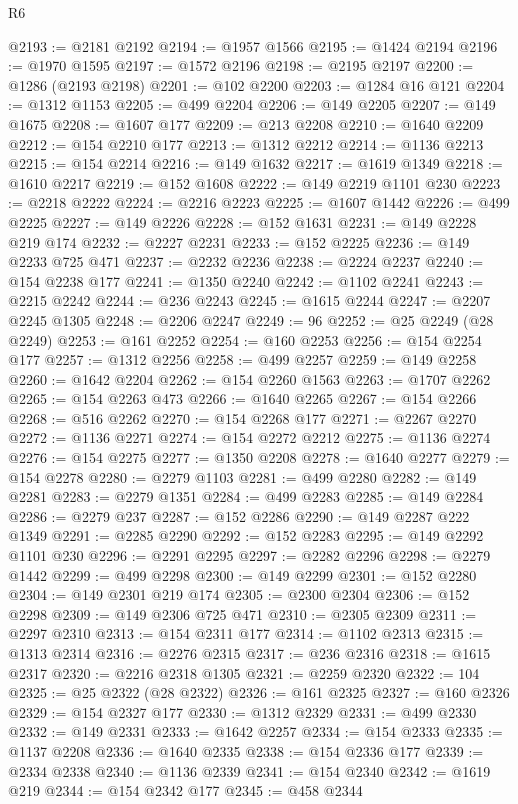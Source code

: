 \begin{lexlean}{R6}
\begin{coremodule}
@2193 := @2181 @2192
@2194 := @1957 @1566
@2195 := @1424 @2194
@2196 := @1970 @1595
@2197 := @1572 @2196
@2198 := @2195 @2197
@2200 := @1286 (@2193 @2198)
@2201 := @102 @2200
@2203 := @1284 @16 @121
@2204 := @1312 @1153
@2205 := @499 @2204
@2206 := @149 @2205
@2207 := @149 @1675
@2208 := @1607 @177
@2209 := @213 @2208
@2210 := @1640 @2209
@2212 := @154 @2210 @177
@2213 := @1312 @2212
@2214 := @1136 @2213
@2215 := @154 @2214
@2216 := @149 @1632
@2217 := @1619 @1349
@2218 := @1610 @2217
@2219 := @152 @1608
@2222 := @149 @2219 @1101 @230
@2223 := @2218 @2222
@2224 := @2216 @2223
@2225 := @1607 @1442
@2226 := @499 @2225
@2227 := @149 @2226
@2228 := @152 @1631
@2231 := @149 @2228 @219 @174
@2232 := @2227 @2231
@2233 := @152 @2225
@2236 := @149 @2233 @725 @471
@2237 := @2232 @2236
@2238 := @2224 @2237
@2240 := @154 @2238 @177
@2241 := @1350 @2240
@2242 := @1102 @2241
@2243 := @2215 @2242
@2244 := @236 @2243
@2245 := @1615 @2244
@2247 := @2207 @2245 @1305
@2248 := @2206 @2247
@2249 := 96
@2252 := @25 @2249 (@28 @2249)
@2253 := @161 @2252
@2254 := @160 @2253
@2256 := @154 @2254 @177
@2257 := @1312 @2256
@2258 := @499 @2257
@2259 := @149 @2258
@2260 := @1642 @2204
@2262 := @154 @2260 @1563
@2263 := @1707 @2262
@2265 := @154 @2263 @473
@2266 := @1640 @2265
@2267 := @154 @2266
@2268 := @516 @2262
@2270 := @154 @2268 @177
@2271 := @2267 @2270
@2272 := @1136 @2271
@2274 := @154 @2272 @2212
@2275 := @1136 @2274
@2276 := @154 @2275
@2277 := @1350 @2208
@2278 := @1640 @2277
@2279 := @154 @2278
@2280 := @2279 @1103
@2281 := @499 @2280
@2282 := @149 @2281
@2283 := @2279 @1351
@2284 := @499 @2283
@2285 := @149 @2284
@2286 := @2279 @237
@2287 := @152 @2286
@2290 := @149 @2287 @222 @1349
@2291 := @2285 @2290
@2292 := @152 @2283
@2295 := @149 @2292 @1101 @230
@2296 := @2291 @2295
@2297 := @2282 @2296
@2298 := @2279 @1442
@2299 := @499 @2298
@2300 := @149 @2299
@2301 := @152 @2280
@2304 := @149 @2301 @219 @174
@2305 := @2300 @2304
@2306 := @152 @2298
@2309 := @149 @2306 @725 @471
@2310 := @2305 @2309
@2311 := @2297 @2310
@2313 := @154 @2311 @177
@2314 := @1102 @2313
@2315 := @1313 @2314
@2316 := @2276 @2315
@2317 := @236 @2316
@2318 := @1615 @2317
@2320 := @2216 @2318 @1305
@2321 := @2259 @2320
@2322 := 104
@2325 := @25 @2322 (@28 @2322)
@2326 := @161 @2325
@2327 := @160 @2326
@2329 := @154 @2327 @177
@2330 := @1312 @2329
@2331 := @499 @2330
@2332 := @149 @2331
@2333 := @1642 @2257
@2334 := @154 @2333
@2335 := @1137 @2208
@2336 := @1640 @2335
@2338 := @154 @2336 @177
@2339 := @2334 @2338
@2340 := @1136 @2339
@2341 := @154 @2340
@2342 := @1619 @219
@2344 := @154 @2342 @177
@2345 := @458 @2344

\end{coremodule}
\end{lexlean}
